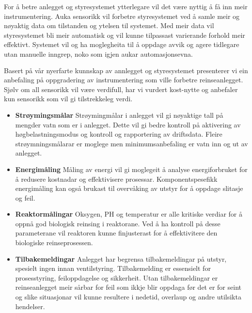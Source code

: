 For å betre anlegget og styresystemet ytterlegare vil det være nyttig å få inn meir instrumentering. 
Auka sensorikk vil forbetre styresystemet ved å samle meir og nøyaktig data om tilstanden og ytelsen til systemet. 
Med meir data vil styresystemet bli meir automatisk og vil kunne tilpassast varierande forhold meir effektivt. 
Systemet vil og ha moglegheita til å oppdage avvik og agere tidlegare utan manuelle inngrep, noko som igjen aukar automasjonsevna.

Basert på vår nyerfarte kunnskap av annlegget og styresystemet presenterer vi ein
anbefaling på oppgradering av instrumentering som ville forbetre reinseanlegget. 
Sjølv om all sensorikk vil være verdifull, har vi vurdert kost-nytte og anbefaler kun sensorikk som vil gi tilstrekkeleg verdi.

\begin{itemize}
    \item \textbf{Strøymingsmålar} \newline
        Strøymingmålar i anlegget vil gi nøyaktige tall på mengder vatn som er i anlegget.
        Dette vil gi bedre kontroll på aktivering av høgbelastningsmodus og kontroll og rapportering av driftsdata.
        Fleire strøymningsmålarar er moglege men minimumsanbefaling er vatn inn og ut av anlegget.
    \item \textbf{Energimåling} \newline
        Måling av energi vil gi moglegeit å analyse energiforbruket for å redusere kostnadar og effektivisere prosessar.
        Komponentspesefikk energimåling kan også brukast til overvåking av utstyr for å oppdage slitasje og feil.
    \item \textbf{Reaktormålingar} \newline
        Oksygen, PH og temperatur er alle kritiske verdiar for å oppnå god biologisk reinsing i reaktorane. \newline
        Ved å ha kontroll på desse parameterane vil reaktoren kunne finjusterast for å effektivitere den biologiske reinseprosessen.
    \item \textbf{Tilbakemeldingar} \newline
        Anlegget har begrensa tilbakemeldingar på utstyr, spesielt ingen innan ventilstyring.
        Tilbakemelding er essensielt for prosesstyring, feiloppdagelse og sikkerheit.
        Utan tilbakemeldingar er reinseanlegget meir sårbar for feil som ikkje blir oppdaga før det er for seint 
        og slike situasjonar vil kunne resultere i nedetid, overlaup og andre utilsikta hendelser.

\end{itemize}
